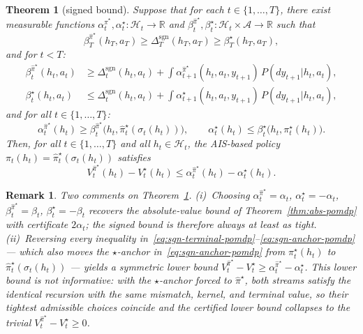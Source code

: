 \documentclass[10pt]{article}
\newtheorem{theorem}{Theorem}
\newtheorem{remark}{Remark}
\theoremstyle{definition}
\newcommand{\Dsgn}{\Delta^{\mathrm{sgn}}}
\begin{document}
\begin{theorem}[signed bound]\label{thm:sgn-pomdp}
Suppose that for each $t \in \{1, \dots, T\}$, there exist measurable
functions $\alpha^{\hat\pi^\star}_t, \alpha^\star_t : \mathcal{H}_t \to
\mathbb{R}$ and $\beta^{\hat\pi^\star}_t, \beta^\star_t : \mathcal{H}_t
\times \mathcal{A} \to \mathbb{R}$ such that
\begin{equation}
\beta^{\hat\pi^\star}_T(h_T, a_T) \ge \Dsgn_T(h_T, a_T)
\ge \beta^\star_T(h_T, a_T),
\label{eq:sgn-terminal-pomdp}
\end{equation}
and for $t < T$:
\begin{equation}
\begin{aligned}
\beta^{\hat\pi^\star}_t(h_t, a_t) &\ge \Dsgn_t(h_t, a_t)
+ \int \alpha^{\hat\pi^\star}_{t+1}(h_t, a_t, y_{t+1})\,
  P(dy_{t+1}|h_t, a_t),\\
\beta^{\star}_t(h_t, a_t) &\le \Dsgn_t(h_t, a_t)
+ \int \alpha^{\star}_{t+1}(h_t, a_t, y_{t+1})\,
  P(dy_{t+1}|h_t, a_t),
\end{aligned}
\label{eq:sgn-rec-pomdp}
\end{equation}
and for all $t \in \{1, \dots, T\}$:
\begin{equation}
\alpha^{\hat\pi^\star}_t(h_t)
\ge \beta^{\hat\pi^\star}_t\bigl(h_t, \hat\pi^\star_t(\sigma_t(h_t))\bigr),
\qquad
\alpha^{\star}_t(h_t)
\le \beta^{\star}_t\bigl(h_t, \pi^\star_t(h_t)\bigr).
\label{eq:sgn-anchor-pomdp}
\end{equation}
Then, for all $t \in \{1, \dots, T\}$ and all $h_t \in \mathcal{H}_t$,
the AIS-based policy $\pi_t(h_t) = \hat\pi^\star_t(\sigma_t(h_t))$
satisfies
\[
V^{\hat\pi^\star}_t(h_t) - V^\star_t(h_t)
\le \alpha^{\hat\pi^\star}_t(h_t) - \alpha^{\star}_t(h_t).
\]
\end{theorem}

\begin{remark}\label{rem:collapse}
Two comments on Theorem~\ref{thm:sgn-pomdp}. (i)~Choosing
$\alpha^{\hat\pi^\star}_t = \alpha_t$, $\alpha^\star_t = -\alpha_t$,
$\beta^{\hat\pi^\star}_t = \beta_t$, $\beta^\star_t = -\beta_t$
recovers the absolute-value bound of Theorem~\ref{thm:abs-pomdp} with
certificate $2\alpha_t$; the signed bound is therefore always at least
as tight. (ii)~Reversing every inequality
in~\eqref{eq:sgn-terminal-pomdp}--\eqref{eq:sgn-anchor-pomdp} --- which
also moves the $\star$-anchor in~\eqref{eq:sgn-anchor-pomdp} from
$\pi^\star_t(h_t)$ to $\hat\pi^\star_t(\sigma_t(h_t))$ --- yields a
symmetric \emph{lower} bound $V^{\hat\pi^\star}_t - V^\star_t \ge
\alpha^{\hat\pi^\star}_t - \alpha^\star_t$. This lower bound is not
informative: with the $\star$-anchor forced to $\hat\pi^\star$, both
streams satisfy the identical recursion with the same mismatch, kernel,
and terminal value, so their tightest admissible choices coincide and
the certified lower bound collapses to the trivial
$V^{\hat\pi^\star}_t - V^\star_t \ge 0$.
\end{remark}
\end{document}
